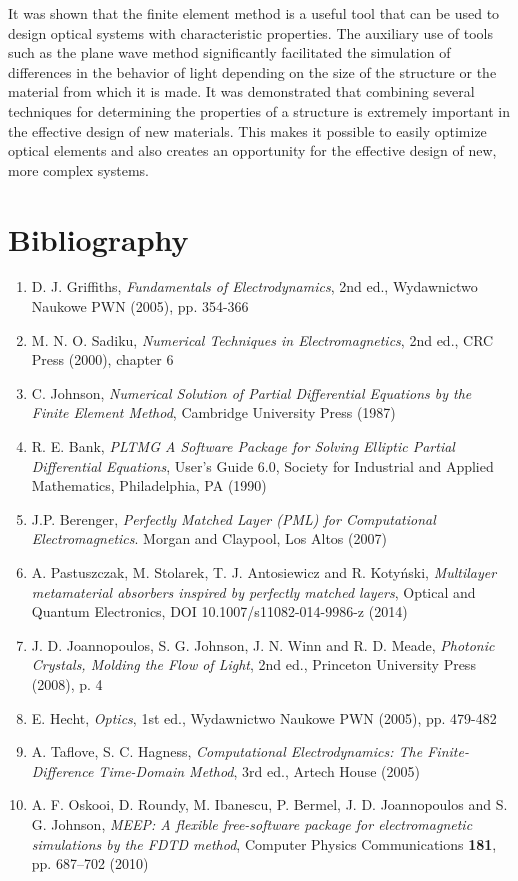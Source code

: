 \documentclass[12pt,a4paper]{article}
\newcommand{\chaptertitle}[1]{\section*{#1}\addcontentsline{toc}{section}{#1}}
\begin{document}
It was shown that the finite element method is a useful tool that can be used to design optical
systems with characteristic properties. The auxiliary use of tools such as the plane wave method
significantly facilitated the simulation of differences in the behavior of light depending on the size
of the structure or the material from which it is made. It was demonstrated that combining several
techniques for determining the properties of a structure is extremely important in the effective design
of new materials. This makes it possible to easily optimize optical elements and also creates an
opportunity for the effective design of new, more complex systems.

\newpage
\chaptertitle{Bibliography}

\begin{enumerate}
\renewcommand{\labelenumi}{[\arabic{enumi}]}
\item D. J. Griffiths, \textit{Fundamentals of Electrodynamics}, 2nd ed., Wydawnictwo Naukowe PWN (2005), pp. 354-366
\item M. N. O. Sadiku, \textit{Numerical Techniques in Electromagnetics}, 2nd ed., CRC Press (2000), chapter 6
\item C. Johnson, \textit{Numerical Solution of Partial Differential Equations by the Finite Element Method}, Cambridge University Press (1987)
\item R. E. Bank, \textit{PLTMG A Software Package for Solving Elliptic Partial Differential Equations}, User's Guide 6.0, Society for Industrial and Applied Mathematics, Philadelphia, PA (1990)
\item J.P. Berenger, \textit{Perfectly Matched Layer (PML) for Computational Electromagnetics}. Morgan and Claypool, Los Altos (2007)
\item A. Pastuszczak, M. Stolarek, T. J. Antosiewicz and R. Kotyński, \textit{Multilayer metamaterial absorbers inspired by perfectly matched layers}, Optical and Quantum Electronics, DOI 10.1007/s11082-014-9986-z (2014)
\item J. D. Joannopoulos, S. G. Johnson, J. N. Winn and R. D. Meade, \textit{Photonic Crystals, Molding the Flow of Light}, 2nd ed., Princeton University Press (2008), p. 4
\item E. Hecht, \textit{Optics}, 1st ed., Wydawnictwo Naukowe PWN (2005), pp. 479-482
\item A. Taflove, S. C. Hagness, \textit{Computational Electrodynamics: The Finite-Difference Time-Domain Method}, 3rd ed., Artech House (2005)
\item A. F. Oskooi, D. Roundy, M. Ibanescu, P. Bermel, J. D. Joannopoulos and S. G. Johnson, \textit{MEEP: A flexible free-software package for electromagnetic simulations by the FDTD method}, Computer Physics Communications \textbf{181}, pp. 687--702 (2010)

\end{enumerate}
\end{document}
